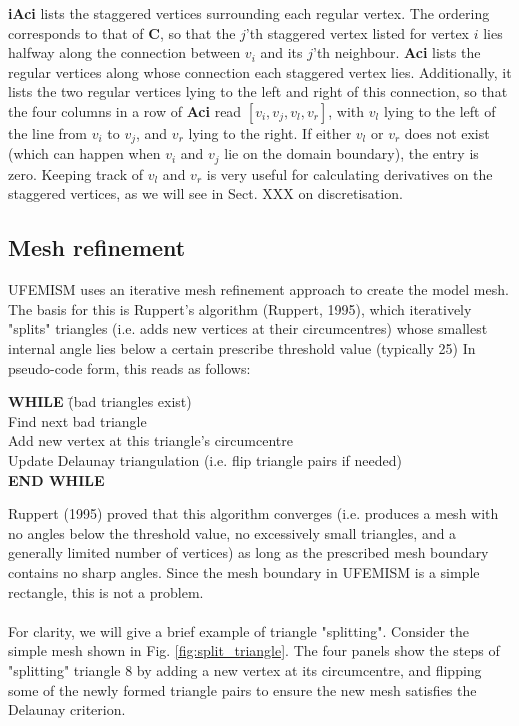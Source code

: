 \documentclass{article}
\begin{document}
\textbf{iAci} lists the staggered vertices surrounding each regular vertex. The ordering corresponds to that of \textbf{C}, so that the $j$'th staggered vertex listed for vertex $i$ lies halfway along the connection between $v_i$ and its $j$'th neighbour. \textbf{Aci} lists the regular vertices along whose connection each staggered vertex lies. Additionally, it lists the two regular vertices lying to the left and right of this connection, so that the four columns in a row of \textbf{Aci} read $[v_i,v_j,v_l,v_r]$, with $v_l$ lying to the left of the line from $v_i$ to $v_j$, and $v_r$ lying to the right. If either $v_l$ or $v_r$ does not exist (which can happen when $v_i$ and $v_j$ lie on the domain boundary), the entry is zero. Keeping track of $v_l$ and $v_r$ is very useful for calculating derivatives on the staggered vertices, as we will see in Sect. XXX on discretisation.


\subsection{Mesh refinement}

UFEMISM uses an iterative mesh refinement approach to create the model mesh. The basis for this is Ruppert's algorithm (Ruppert, 1995), which iteratively "splits" triangles (i.e. adds new vertices at their circumcentres) whose smallest internal angle lies below a certain prescribe threshold value (typically 25\degree) In pseudo-code form, this reads as follows:

\begin{tabbing}
\textbf{WHILE} \=(bad triangles exist)\\
\> Find next bad triangle\\
\> Add new vertex at this triangle's circumcentre\\
\> Update Delaunay triangulation (i.e. flip triangle pairs if needed)\\
\textbf{END WHILE}
\end{tabbing}

Ruppert (1995) proved that this algorithm converges (i.e. produces a mesh with no angles below the threshold value, no excessively small triangles, and a generally limited number of vertices) as long as the prescribed mesh boundary contains no sharp angles. Since the mesh boundary in UFEMISM is a simple rectangle, this is not a problem.\\
\\
For clarity, we will give a brief example of triangle "splitting". Consider the simple mesh shown in Fig. \ref{fig:split_triangle}. The four panels show the steps of "splitting" triangle 8 by adding a new vertex at its circumcentre, and flipping some of the newly formed triangle pairs to ensure the new mesh satisfies the Delaunay criterion.
\end{document}
